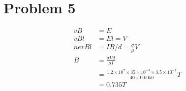 \documentclass[a4paper]{oblivoir}
\begin{document}
\section{Problem 5}
\begin{align}
	vB &= E\\
	vBl &= El = V\\
	nevBl &= IB/d = \frac{\sigma}{\mu}V\\
	B &= \frac{\sigma V d}{\mu I}\\
	&= \frac{1.2\times 10^{7} \times 35\times 10^{-3}\times 3.5\times10^{-7}}{40\times 0.0050}T\\
	&=0.735T
\end{align}
\end{document}
